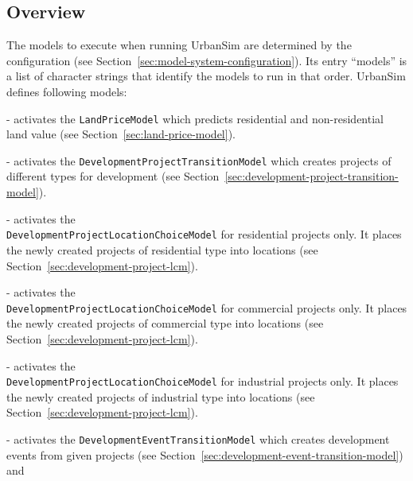 \subsection{Overview}

The models \modelsindex to execute when running UrbanSim are determined by the configuration
(see Section~\ref{sec:model-system-configuration}). Its entry ``models'' \modelsindex is a
list of character strings that identify the models \modelsindex to run in that order.
UrbanSim defines following models: \modelsindex
\begin{description}
  \tight
  \item[``land_price_model''] \modelsindex - activates the \verb|LandPriceModel| \modelsindex which
  predicts residential and non-residential land value (see
  Section~\ref{sec:land-price-model}).
  \item[``development_project_transition_model''] \modelsindex - activates the
  \verb|DevelopmentProjectTransitionModel| \modelsindex which creates projects of different
  types for development (see
  Section~\ref{sec:development-project-transition-model}).
  \item[``residential_development_project_location_choice_model''] \modelsindex - activates
  the \\ \verb|DevelopmentProjectLocationChoiceModel| \modelsindex for residential projects
  only. It places the newly created projects of residential type into locations
  (see Section~\ref{sec:development-project-lcm}).
  \item[``commercial_development_project_location_choice_model''] \modelsindex - activates
  the \\ \verb|DevelopmentProjectLocationChoiceModel| \modelsindex for commercial projects
  only. It places the newly created projects of commercial type into locations
  (see Section~\ref{sec:development-project-lcm}).
  \item[``industrial_development_project_location_choice_model''] \modelsindex - activates
  the \\ \verb|DevelopmentProjectLocationChoiceModel| \modelsindex for industrial projects
  only. It places the newly created projects of industrial type into locations
  (see Section~\ref{sec:development-project-lcm}).
  \item[``development_event_transition_model''] \modelsindex - activates the
  \verb|DevelopmentEventTransitionModel| \modelsindex which creates development events from
  given projects (see Section~\ref{sec:development-event-transition-model}) and

\end{description}
